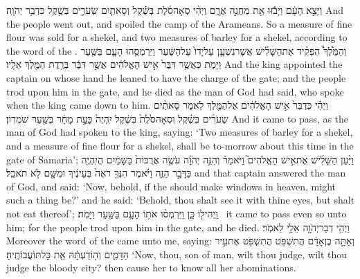 {וַיֵּצֵ֣א הָעָ֔ם וַיָּבֹ֕זּוּ אֵ֖ת מַחֲנֵ֣ה אֲרָ֑ם וַיְהִ֨י סְאָה\maqqaf סֹ֜לֶת בְּשֶׁ֗קֶל וְסָאתַ֧יִם שְׂעֹרִ֛ים בְּשֶׁ֖קֶל כִּדְבַ֥ר יְהֹוָֽה׃}
{And the people went out, and spoiled the camp of the Arameans. So a measure of fine flour was sold for a shekel, and two measures of barley for a shekel, according to the word of the \lord.}
{וְהַמֶּ֩לֶךְ֩ הִפְקִ֨יד אֶת\maqqaf הַשָּׁלִ֜ישׁ אֲשֶׁר\maqqaf נִשְׁעָ֤ן עַל\maqqaf יָדוֹ֙ עַל\maqqaf הַשַּׁ֔עַר וַיִּרְמְסֻ֧הוּ הָעָ֛ם בַּשַּׁ֖עַר וַיָּמֹ֑ת כַּאֲשֶׁ֤ר דִּבֶּר֙ אִ֣ישׁ הָאֱלֹהִ֔ים אֲשֶׁ֣ר דִּבֶּ֔ר בְּרֶ֥דֶת הַמֶּ֖לֶךְ אֵלָֽיו׃}
{And the king appointed the captain on whose hand he leaned to have the charge of the gate; and the people trod upon him in the gate, and he died as the man of God had said, who spoke when the king came down to him.}
{וַיְהִ֗י כְּדַבֵּר֙ אִ֣ישׁ הָאֱלֹהִ֔ים אֶל\maqqaf הַמֶּ֖לֶךְ לֵאמֹ֑ר סָאתַ֨יִם שְׂעֹרִ֜ים בְּשֶׁ֗קֶל וּֽסְאָה\maqqaf סֹ֙לֶת֙ בְּשֶׁ֔קֶל יִֽהְיֶה֙ כָּעֵ֣ת מָחָ֔ר בְּשַׁ֖עַר שֹׁמְרֽוֹן׃}
{And it came to pass, as the man of God had spoken to the king, saying: ‘Two measures of barley for a shekel, and a measure of fine flour for a shekel, shall be to-morrow about this time in the gate of Samaria’;}
{וַיַּ֨עַן הַשָּׁלִ֜ישׁ אֶת\maqqaf אִ֣ישׁ הָאֱלֹהִים֮ וַיֹּאמַר֒ וְהִנֵּ֣ה יְהֹוָ֗ה עֹשֶׂ֤ה אֲרֻבּוֹת֙ בַּשָּׁמַ֔יִם הֲיִֽהְיֶ֖ה כַּדָּבָ֣ר הַזֶּ֑ה וַיֹּ֗אמֶר הִנְּךָ֤ רֹאֶה֙ בְּעֵינֶ֔יךָ וּמִשָּׁ֖ם לֹ֥א תֹאכֵֽל׃}
{and that captain answered the man of God, and said: ‘Now, behold, if the \lord\space should make windows in heaven, might such a thing be?’ and he said: ‘Behold, thou shalt see it with thine eyes, but shalt not eat thereof’;}
{וַֽיְהִי\maqqaf ל֖וֹ כֵּ֑ן וַיִּרְמְס֨וּ אֹת֥וֹ הָעָ֛ם בַּשַּׁ֖עַר וַיָּמֹֽת׃ \setuma }
{it came to pass even so unto him; for the people trod upon him in the gate, and he died.}
\label{haft_29}
\setcounter{chap}{22}
\setcounter{verse}{1}
{וַיְהִ֥י דְבַר\maqqaf יְהֹוָ֖ה אֵלַ֥י לֵאמֹֽר׃}
{Moreover the word of the \lord\space came unto me, saying:}
{וְאַתָּ֣ה בֶן\maqqaf אָדָ֔ם הֲתִשְׁפֹּ֥ט הֲתִשְׁפֹּ֖ט אֶת\maqqaf עִ֣יר הַדָּמִ֑ים וְה֣וֹדַעְתָּ֔הּ אֵ֖ת כׇּל\maqqaf תּוֹעֲבוֹתֶֽיהָ׃}
{‘Now, thou, son of man, wilt thou judge, wilt thou judge the bloody city? then cause her to know all her abominations.}
